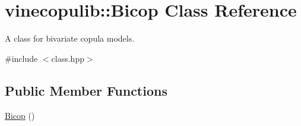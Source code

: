 \hypertarget{classvinecopulib_1_1_bicop}{}\section{vinecopulib\+:\+:Bicop Class Reference}
\label{classvinecopulib_1_1_bicop}


A class for bivariate copula models.  




{\ttfamily \#include $<$class.\+hpp$>$}

\subsection*{Public Member Functions}
\begin{DoxyCompactItemize}
\item 
\hyperlink{classvinecopulib_1_1_bicop_acfa522fb0bea4aca8fade87c18bcf921}{Bicop} ()\hypertarget{classvinecopulib_1_1_bicop_acfa522fb0bea4aca8fade87c18bcf921}{}\label{classvinecopulib_1_1_bicop_acfa522fb0bea4aca8fade87c18bcf921}


\end{DoxyCompactItemize}
